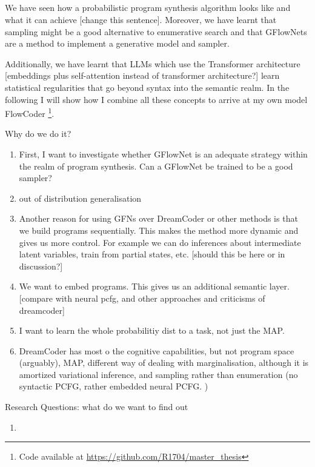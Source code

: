 \subsection{}

We have seen how a probabilistic program synthesis algorithm looks like and what it can achieve [change this sentence]. 
Moreover, we have learnt that sampling might be a good alternative to enumerative search and that GFlowNets are a method to implement a generative model and sampler. 

Additionally, we have learnt that LLMs which use the Transformer architecture [embeddings plus self-attention instead of transformer architecture?] learn statistical regularities that go beyond syntax into the semantic realm. In the following I will show how I combine all these concepts to arrive at my own model \textrm{FlowCoder} \footnote{Code available at \url{https://github.com/R1704/master_thesis}}.


Why do we do it?
\begin{enumerate}
    \item First, I want to investigate whether GFlowNet is an adequate strategy within the realm of program synthesis. Can a GFlowNet be trained to be a good sampler?
    \item out of distribution generalisation 
    \item Another reason for using GFNs over DreamCoder or other methods is that we build programs sequentially. This makes the method more dynamic and gives us more control. For example we can do inferences about intermediate latent variables, train from partial states, etc. [should this be here or in discussion?]
    \item We want to embed programs. This gives us an additional semantic layer. [compare with neural pcfg, and other approaches and criticisms of dreamcoder]
    \item I want to learn the whole probabilitiy dist to a task, not just the MAP.
    \item DreamCoder has most o the cognitive capabilities, but not program space (arguably), MAP, different way of dealing with marginalisation, although it is amortized variational inference, and sampling rather than enumeration (no syntactic PCFG, rather embedded neural PCFG. )
\end{enumerate}





Research Questions: what do we want to find out
\begin{enumerate}
    \item 
\end{enumerate} 






